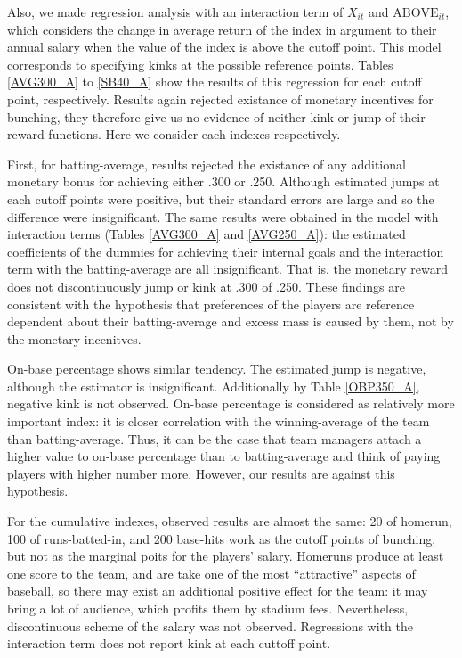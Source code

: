 \documentclass[dvipdfmx, 12pt]{article}
\begin{document}
Also, we made regression analysis with an interaction term of $X_{it}$ and $\text{ABOVE}_{it}$, which considers the change in average return of the index in argument to their annual salary when the value of the index is above the cutoff point. This model corresponds to specifying kinks at the possible reference points. Tables \ref{AVG300_A} to \ref{SB40_A} show the results of this regression for each cutoff point, respectively. Results again rejected existance of monetary incentives for bunching, they therefore give us no evidence of neither kink or jump of their reward functions. Here we consider each indexes respectively.

First, for batting-average, results rejected the existance of any additional monetary bonus for achieving either .300 or .250. Although estimated jumps at each cutoff points were positive, but their standard errors are large and so the difference were insignificant. The same results were obtained in the model with interaction terms (Tables \ref{AVG300_A} and \ref{AVG250_A}): the estimated coefficients of the dummies for achieving their internal goals and the interaction term with the batting-average are all insignificant. That is, the monetary reward does not discontinuously jump or kink at .300 of .250. These findings are consistent with the hypothesis that preferences of the players are reference dependent about their batting-average and excess mass is caused by them, not by the monetary incenitves.

On-base percentage shows similar tendency. The estimated jump is negative, although the estimator is insignificant. Additionally by Table \ref{OBP350_A}, negative kink is not observed. On-base percentage is considered as relatively more important index: it is closer correlation with the winning-average of the team than batting-average. Thus, it can be the case that team managers attach a higher value to on-base percentage than to batting-average and think of paying players with higher number more. However, our results are against this hypothesis.

For the cumulative indexes, observed results are almost the same: 20 of homerun, 100 of runs-batted-in, and 200 base-hits work as the cutoff points of bunching, but not as the marginal poits for the players' salary. Homeruns produce at least one score to the team, and are take one of the most ``attractive'' aspects of baseball, so there may exist an additional positive effect for the team: it may bring a lot of audience, which profits them by stadium fees. Nevertheless, discontinuous scheme of the salary was not observed. Regressions with the interaction term does not report kink at each cuttoff point.
\end{document}
